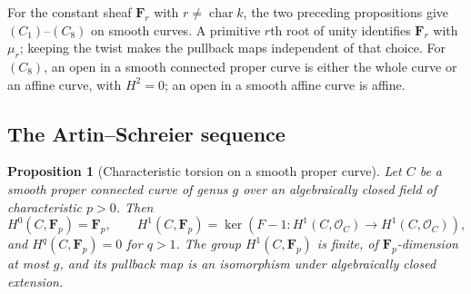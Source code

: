 \documentclass[11pt,a4paper]{article}
\numberwithin{equation}{section}
\newtheorem{proposition}[theorem]{Proposition}
\theoremstyle{definition}
\theoremstyle{remark}
\newcommand{\cO}{\mathcal O}
\begin{document}
For the constant sheaf $\mathbf F_r$ with $r\ne\operatorname{char}k$,
the two preceding propositions give $(C_1)$--$(C_8)$ on smooth curves.
A primitive $r$th root of unity identifies $\mathbf F_r$ with $\mu_r$;
keeping the twist makes the pullback maps independent of that choice.
For $(C_8)$, an open in a smooth connected proper curve is either the
whole curve or an affine curve, with $H^2=0$; an open in a smooth affine
curve is affine.

\subsection{The Artin--Schreier sequence}

\begin{proposition}[Characteristic torsion on a smooth proper curve]
\label{app:curve-artin-schreier}
Let $C$ be a smooth proper connected curve of genus $g$ over an
algebraically closed field of characteristic $p>0$.  Then
\[
 H^0(C,\mathbf F_p)=\mathbf F_p,\qquad
 H^1(C,\mathbf F_p)=
 \ker(F-1:H^1(C,\cO_C)\to H^1(C,\cO_C)),
\]
and $H^q(C,\mathbf F_p)=0$ for $q>1$.  The group $H^1(C,\mathbf F_p)$
is finite, of $\mathbf F_p$-dimension at most $g$, and its pullback map
is an isomorphism under algebraically closed extension.
\end{proposition}
\end{document}
